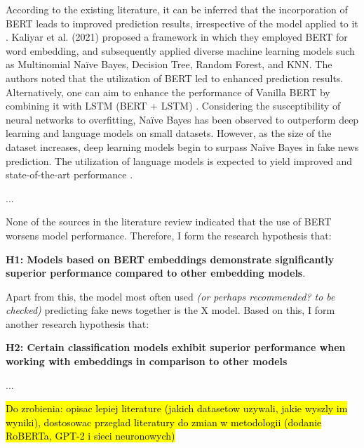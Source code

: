 According to the existing literature, it can be inferred that the incorporation of BERT leads to improved prediction results, irrespective of the model applied to it \autocite{Kaliyar2021}. Kaliyar et al. (2021) proposed a framework in which they employed BERT for word embedding, and subsequently applied diverse machine learning models such as Multinomial Naïve Bayes, Decision Tree, Random Forest, and KNN. The authors noted that the utilization of BERT led to enhanced prediction results. Alternatively, one can aim to enhance the performance of Vanilla BERT by combining it with LSTM (BERT + LSTM) \autocite{Rai2022}. 
Considering the susceptibility of neural networks to overfitting, Naïve Bayes has been observed to outperform deep learning and language models on small datasets. However, as the size of the dataset increases, deep learning models begin to surpass Naïve Bayes in fake news prediction. The utilization of language models is expected to yield improved and state-of-the-art performance \autocite{Khan2021}.

...


None of the sources in the literature review indicated that the use of BERT worsens model performance. Therefore, I form the research hypothesis that:
\vspace{0.2cm}

\noindent\textbf{H1: Models based on BERT embeddings demonstrate significantly superior performance compared to other embedding models}. %
\vspace{0.2cm}

Apart from this, the model most often used \textit{(or perhaps recommended? to be checked)} predicting fake news together is the X model. Based on this, I form another research hypothesis that:
\vspace{0.2cm}

\noindent\textbf{H2: Certain classification models exhibit superior performance when working with embeddings in comparison to other models}
\vspace{0.2cm}

...


\hl{Do zrobienia: opisac lepiej literature (jakich datasetow uzywali, jakie wyszly im wyniki), dostosowac przeglad literatury do zmian w metodologii (dodanie RoBERTa, GPT-2 i sieci neuronowych)}